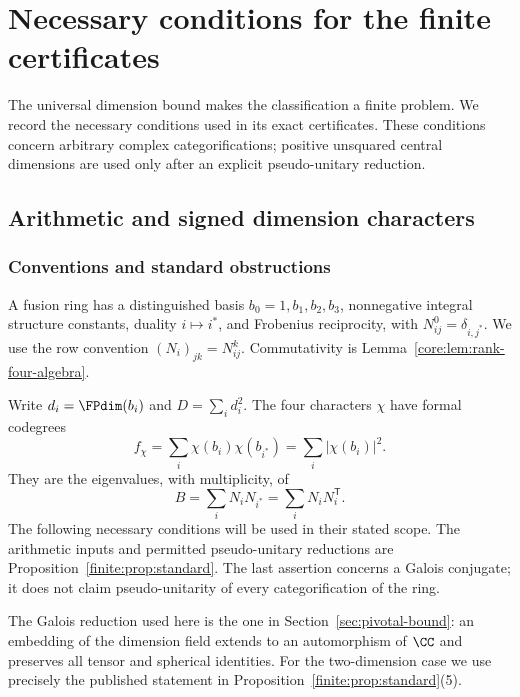 \section{Necessary conditions for the finite certificates}\label{sec:finite-criteria}
The universal dimension bound makes the classification a finite problem.
We record the necessary conditions used in its exact certificates. These
conditions concern arbitrary complex categorifications; positive unsquared
central dimensions are used only after an explicit pseudo-unitary reduction.

\subsection{Arithmetic and signed dimension characters}\label{finite:sec:finite-arithmetic}
\subsubsection{Conventions and standard obstructions}
A fusion ring has a distinguished basis $b_0=1,b_1,b_2,b_3$, nonnegative
integral structure constants, duality $i\mapsto i^*$, and Frobenius
reciprocity, with $N_{ij}^0=\delta_{i,j^*}$. We use the row convention
$(N_i)_{jk}=N_{ij}^k$. Commutativity is Lemma~\ref{core:lem:rank-four-algebra}.

Write $d_i=\FPdim(b_i)$ and $D=\sum_i d_i^2$. The four characters $\chi$
have formal codegrees
\[
f_\chi=\sum_i\chi(b_i)\chi(b_{i^*})
       =\sum_i|\chi(b_i)|^2.
\]
They are the eigenvalues, with multiplicity, of
\begin{equation}\label{finite:eq:casimir}
 B=\sum_i N_iN_{i^*}=\sum_iN_iN_i^{\mathsf T}.
\end{equation}
The following necessary conditions will be used in their stated scope.
The arithmetic inputs and permitted pseudo-unitary reductions are
Proposition~\ref{finite:prop:standard}.
The last assertion concerns a Galois conjugate; it does not claim
pseudo-unitarity of every categorification of the ring.

The Galois reduction used here is the one in
Section~\ref{sec:pivotal-bound}: an embedding of the dimension field
extends to an automorphism of $\CC$ and preserves all tensor and
spherical identities. For the two-dimension case we use precisely the
published statement in Proposition~\ref{finite:prop:standard}(5).

